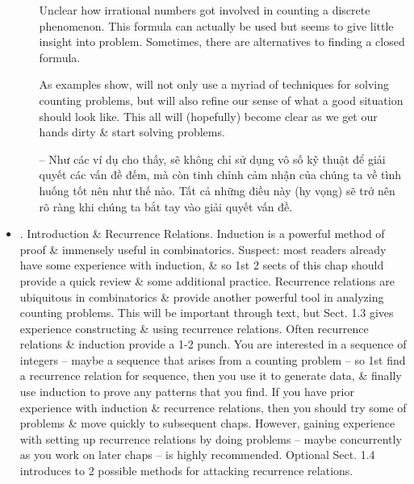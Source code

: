\documentclass{article}
\begin{document}
\begin{itemize}
\begin{itemize}
		Unclear how irrational numbers got involved in counting a discrete phenomenon. This formula can actually be used but seems to give little insight into problem. Sometimes, there are alternatives to finding a closed formula.
		
		As examples show, will not only use a myriad of techniques for solving counting problems, but will also refine our sense of what a good situation should look like. This all will (hopefully) become clear as we get our hands dirty \& start solving problems.
		
		-- Như các ví dụ cho thấy, sẽ không chỉ sử dụng vô số kỹ thuật để giải quyết các vấn đề đếm, mà còn tinh chỉnh cảm nhận của chúng ta về tình huống tốt nên như thế nào. Tất cả những điều này (hy vọng) sẽ trở nên rõ ràng khi chúng ta bắt tay vào giải quyết vấn đề.
	\end{itemize}
	\item {. Introduction \& Recurrence Relations.} Induction is a powerful method of proof \& immensely useful in combinatorics. Suspect: most readers already have some experience with induction, \& so 1st 2 sects of this chap should provide a quick review \& some additional practice. Recurrence relations are ubiquitous in combinatorics \& provide another powerful tool in analyzing counting problems. This will be important through text, but Sect. 1.3 gives experience constructing \& using recurrence relations. Often recurrence relations \& induction provide a 1-2 punch. You are interested in a sequence of integers -- maybe a sequence that arises from a counting problem -- so 1st find a recurrence relation for sequence, then you use it to generate data, \& finally use induction to prove any patterns that you find. If you have prior experience with induction \& recurrence relations, then you should try some of problems \& move quickly to subsequent chaps. However, gaining experience with setting up recurrence relations by doing problems -- maybe concurrently as you work on later chaps -- is highly recommended. Optional Sect. 1.4 introduces to 2 possible methods for attacking recurrence relations.
	

\end{itemize}
\end{document}
